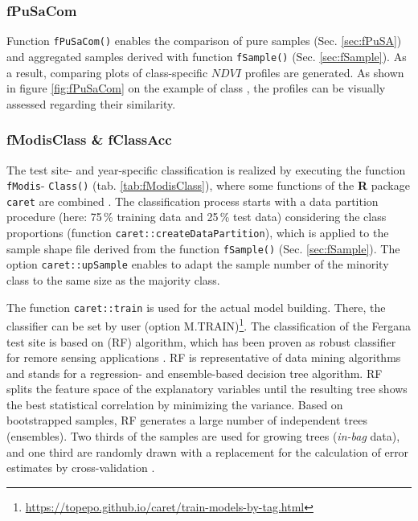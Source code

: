 \subsubsection{fPuSaCom}
Function \texttt{fPuSaCom()} enables the comparison of pure samples (Sec. \ref{sec:fPuSA}) and aggregated samples derived with function \texttt{fSample()} (Sec. \ref{sec:fSample}). As a result,  comparing plots of class-specific $NDVI$ profiles are generated. As shown in figure \ref{fig:fPuSaCom} on the example of class , the profiles can be visually assessed regarding their similarity.

\subsubsection{fModisClass \& fClassAcc}\label{sec:fModisClass}
The test site- and year-specific classification is realized by executing the function \texttt{fModis}- \texttt{Class()} (tab. \ref{tab:fModisClass}), where some functions of the \textbf{R} package \texttt{caret} are combined \citep{KuhnJohnson2013apm,Kuhn-etal2018}. The  classification process starts with a data partition procedure (here: 75\,\% training data and 25\,\% test data) considering the class proportions (function \texttt{caret::createDataPartition}), which is applied to the sample shape file derived from the  function \texttt{fSample()} (Sec. \ref{sec:fSample}). The option \texttt{caret::upSample} enables to adapt the sample number of the minority class to the same size as the majority class.\


The function \texttt{caret::train} is used for the actual model building. There, the classifier can be set by user (option M.TRAIN)\footnote{\url{https://topepo.github.io/caret/train-models-by-tag.html}}. 
The classification of the Fergana test site is based on  (RF) algorithm, which has been proven as robust classifier for remore sensing applications \citep{BelgiuDragut2016jprs}. RF is  representative of data mining algorithms and stands for a re\-gres\-si\-on- and ensemble-based decision tree algorithm. RF splits the feature space of the explanatory variables until the resulting tree shows the best statistical correlation by minimizing the variance. Based on bootstrapped samples, RF generates a large number of independent trees (ensembles). Two thirds of the samples are used for growing trees (\textit{in-bag} data), and one third are randomly drawn with a replacement for the calculation of error estimates by cross-validation  \citep[\textit{out-of-bag} data; ][]{Breiman2001ml}.\


